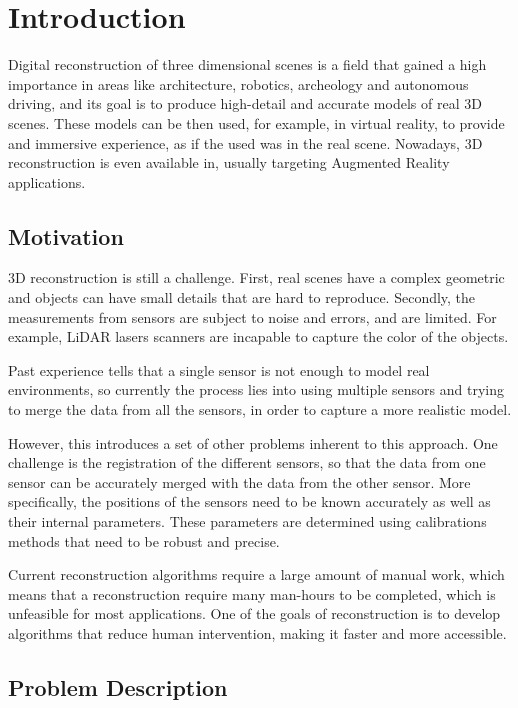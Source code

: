 \chapter{Introduction}

Digital reconstruction of three dimensional scenes is a field that gained a high importance in areas like architecture, robotics, archeology and autonomous driving, and its goal is to produce high-detail and accurate models of real 3D scenes. These models can be then used, for example, in virtual reality, to provide and immersive experience, as if the used was in the real scene. Nowadays, 3D reconstruction is even available in, usually targeting Augmented Reality applications.

\section{Motivation}

3D reconstruction is still a challenge. First, real scenes have a complex geometric and objects can have small details that are hard to reproduce. Secondly, the measurements from sensors are subject to noise and errors, and are limited. For example, LiDAR lasers scanners are incapable to capture the color of the objects.

Past experience tells that a single sensor is not enough to model real environments, so currently the process lies into using multiple sensors and trying to merge the data from all the sensors, in order to capture a more realistic model.

However, this introduces a set of other problems inherent to this approach. One challenge is the registration of the different sensors, so that the data from one sensor can be accurately merged with the data from the other sensor. More specifically, the positions of the sensors need to be known accurately as well as their internal parameters. These parameters are determined using calibrations methods that need to be robust and precise.

Current reconstruction algorithms require a large amount of manual work, which means that a reconstruction require many man-hours to be completed, which is unfeasible for most applications. One of the goals of reconstruction is to develop algorithms that reduce human intervention, making it faster and more accessible. 

\section{Problem Description}


